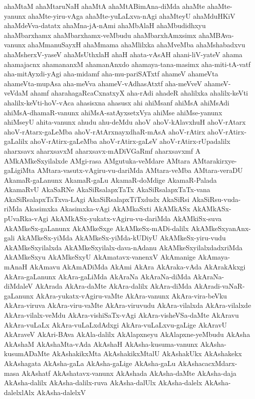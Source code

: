 {ahaMtaM
ahaMtaruNaH
ahaMtA
ahaMtABimAna-diMda
ahaMte
ahaMte-yanunx
ahaMte-yiru-vAga
ahaMte-yuLaLxva-nAgi
ahaMteyU
ahaMduHKiV
ahaMdeVva-datatx
ahaMna-jA-nAmi
ahaMbAlaH
ahaMbudidhxyu
ahaMbarxhamx
ahaMbarxhamx-veMbudu
ahaMbarxhAmxsimx
ahaMBAva-vanunx
ahaMmanuSayxH
ahaMmama
ahaMlilxka
ahaMveMba
ahaMshabadxvu
ahaMsherxV-yaseV
ahaMsUthxlaH
ahaH
ahata-vAsAH
ahani-liV-yateV
ahama
ahamajacnx
ahamananxM
ahamanAnxdo
ahamaya-tana-masimx
aha-miti-tA-vatf
aha-mitAyxdi-yAgi
aha-midamf
aha-mu-pariSATxtf
ahameV
ahameVta
ahameVta-mupAsa
aha-meVva
ahameV-vAdhasAtxtf
aha-meVveV
ahameV-veVdaM
ahamf
aharahagaRcaCxnatxyX
aha-rAdi
ahadeR
ahalilxka
ahalilx-keVti
ahalilx-keVti-hoV-vAca
ahasisxna
ahasusx
ahi
ahiMsanf
ahiMsA
ahiMsAdi
ahiMsA-dhamaR-vanunx
ahiMsA-satAyxsetxVya
ahiMse
ahiMse-yanunx
ahiMseyU
ahita-vanunx
ahudu
ahu-deMdu
ahoV
ahoV-kAlavxhuH
ahoV-rAtarx
ahoV-rAtarx-gaLeMba
ahoV-rAtArxnayxdhaR-mAsA
ahoV-rAtirx
ahoV-rAtirx-gaLalilx
ahoV-rAtirx-gaLeMba
ahoV-rAtirx-gaLeV
ahoV-rAtirx-rUpadalilx
aharxsavx
aharxsavxM
aharxsavx-mADiVGaRmf
aharxsavxmf
A
AMkAMkeSxyilalxde
AMgi-rasa
AMgutuka-veMdare
AMtara
AMtarakirxye-gaLigiMta
AMtara-vasutx-vAgiru-vu-dariMda
AMtara-veMba
AMtara-veraDU
AkamaR-gaLanunx
AkamaR-gaLu
AkamaR-doMdige
AkamaR-Palada
AkamaRvU
AkaSaRNe
AkaSiRsalapxTaTx
AkaSiRsalapxTaTx-vana
AkaSiRsalapxTaTxva-LAgi
AkaSiRsalapxTiTxdudx
AkaSiRsi
AkaSiRsu-vuda-riMda
Akasimxka
Akasimxka-vAgi
AkAMkaSxti
AkAMkASx
AkAMkASx-pUvaRka-vAgi
AkAMkASx-yukatx-vAgiru-vu-dariMda
AkAMkiSx-suva
AkAMkeSx-gaLanunx
AkAMkeSxge
AkAMkeSx-mADi-dalilx
AkAMkeSxyanAnx-gali
AkAMkeSx-yiMda
AkAMkeSx-yiMda-kUDiyU
AkAMkeSx-yiru-vudu
AkAMkeSxyilalxda
AkAMkeSxyilalx-dava-nAdanu
AkAMkeSxyilalxdadxriMda
AkAMkeSxyu
AkAMkeSxyU
AkAmatavx-vanenxV
AkAmanige
AkAmaya-mAnaH
AkAmavu
AkAmADiMda
AkAmi
AkAra
AkAraka-vAda
AkArakAkxgi
AkAra-gaLanunx
AkAra-gaLiMda
AkAraNa
AkAraNa-diMda
AkAraNa-diMdaleV
AkArada
AkAra-daMte
AkAra-dalilx
AkAra-diMda
AkAradi-vaNaR-gaLanunx
AkAra-yukatx-vAgiru-vaMte
AkAra-vanunx
AkAra-vira-beVku
AkAra-viruva
AkAra-viru-vaMte
AkAra-viruvudu
AkAra-vilalxda
AkAra-vilalxde
AkAra-vilalx-veMdu
AkAra-vishiSaTx-vAgi
AkAra-visheVSa-daMte
AkAravu
AkAra-vuLaLx
AkAra-vuLaLxdAdxgi
AkAra-vuLaLxvu-gaLige
AkAravU
AkAraveV
AkAri-BAva
AkAla-dalilx
AkAlapxneyu
AkAlapxne-yeMbudu
AkAsha
AkAshaM
AkAshaMta-vAda
AkAshaH
AkAsha-kusuma-vanunx
AkAsha-kusumADaMte
AkAshakikxMta
AkAshakikxMtalU
AkAshakUkx
AkAshakekx
AkAshagata
AkAsha-gaLa
AkAsha-gaLige
AkAsha-gaLu
AkAshacacxMdarx-masa
AkAshatf
AkAshatavx-vanunx
AkAshada
AkAsha-daMte
AkAsha-daja
AkAsha-dalilx
AkAsha-dalilx-ruva
AkAsha-dalUlx
AkAsha-dalelx
AkAsha-dalelxlAlx
AkAsha-dalelxV
}
